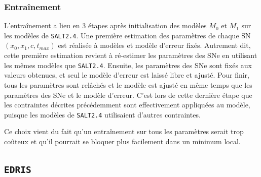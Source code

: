 \documentclass{book}
\def\edris{\texttt{EDRIS}\xspace}
\def\saltd{\texttt{SALT2.4}\xspace}
\begin{document}
 \subsubsection{Entraînement}

L'entraînement a lieu en 3 étapes après initialisation des modèles $M_0$ et $M_1$ sur les modèles de \saltd. Une première estimation des paramètres de chaque SN $(x_0, x_1, c, t_{max})$ est réalisée à modèles et modèle d'erreur fixés. Autrement dit, cette première estimation revient à ré-estimer les paramètres des SNe en utilisant les mêmes modèles que \saltd. Ensuite, les paramètres des SNe sont fixés aux valeurs obtenues, et seul le modèle d'erreur est laissé libre et ajusté. Pour finir, tous les paramètres sont relâchés et le modèle est ajusté en même temps que les paramètres des SNe et le modèle d'erreur. C'est lors de cette dernière étape que les contraintes décrites précédemment sont effectivement appliquées au modèle, puisque les modèles de \saltd utilisaient d'autres contraintes.

Ce choix vient du fait qu'un entraînement sur tous les paramètres serait trop coûteux et qu'il pourrait se bloquer plus facilement dans un minimum local.

\subsection{\edris}
\label{anx:edris}
\end{document}
